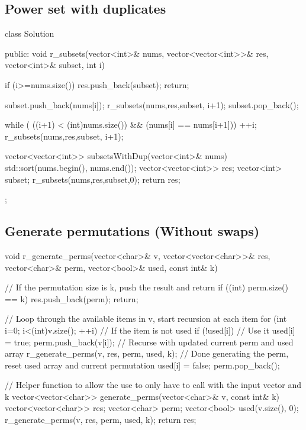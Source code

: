 \documentclass{report}
\begin{document}
\subsection{Power set with duplicates}
\bigbreak \noindent 
\begin{cppcode}
    class Solution {
        public:
        void r_subsets(vector<int>& nums, vector<vector<int>>& res, vector<int>& subset, int i) {
            if (i>=nums.size()) {
                res.push_back(subset);
                return;
            }

            subset.push_back(nums[i]);
            r_subsets(nums,res,subset, i+1);
            subset.pop_back();

            while ( ((i+1) < (int)nums.size()) && (nums[i] == nums[i+1])) {
                ++i;
            }
            r_subsets(nums,res,subset, i+1);
        }
        vector<vector<int>> subsetsWithDup(vector<int>& nums) {
            std::sort(nums.begin(), nums.end());
            vector<vector<int>> res;
            vector<int> subset;
            r_subsets(nums,res,subset,0);
            return res;
        }
    };
\end{cppcode}

\pagebreak \bigbreak \noindent 
\subsection{Generate permutations (Without swaps)}
\bigbreak \noindent 
\begin{cppcode}
    void r_generate_perms(vector<char>& v, vector<vector<char>>& res, vector<char>& perm, vector<bool>& used, const int& k) {
        // If the permutation size is k, push the result and return
        if ((int) perm.size() == k) {
            res.push_back(perm);
            return;
        }

        // Loop through the available items in v, start recursion at each item
        for (int i=0; i<(int)v.size(); ++i) {
            // If the item is not used
            if (!used[i]) {
                // Use it
                used[i] = true;
                perm.push_back(v[i]);
                // Recurse with updated current perm and used array
                r_generate_perms(v, res, perm, used, k);
                // Done generating the perm, reset used array and current permutation
                used[i] = false;
                perm.pop_back();
            }
        }
    }

    // Helper function to allow the use to only have to call with the input vector and k
    vector<vector<char>> generate_perms(vector<char>& v, const int& k) {
        vector<vector<char>> res; 
        vector<char> perm;
        vector<bool> used(v.size(), 0);
        r_generate_perms(v, res, perm, used, k);
        return res;
    }
\end{cppcode}
\end{document}
